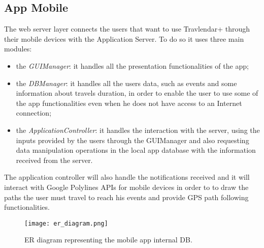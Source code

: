 \subsection{App Mobile}
\label{subsect:App Mobile}
	The web server layer connects the users that want to use Travlendar+ through their mobile devices with the Application Server.
	To do so it uses three main modules: 
	\begin{itemize}
	\item the \textit{GUIManager}: it handles all the presentation functionalities of the app;
	\item the \textit{DBManager}: it handles all the users data, such as events and some information about travels duration, in order to enable the user to use some of the app functionalities even when he does not have access to an Internet connection;
	\item the \textit{ApplicationController}: it handles the interaction with the server, using the inputs provided by the users through the GUIManager and also requesting data manipulation operations in the local app database with the information received from the server.
	\end{itemize}
	The application controller will also handle the notifications received and it will interact with Google Polylines APIs for mobile devices in order to to draw the paths the user must travel to reach his events and provide GPS path following functionalities.
\begin{figure} [H]
	\texttt{[image: er\_diagram.png]}
	\centering
	\caption{ER diagram representing the mobile app internal DB.}
\end{figure}